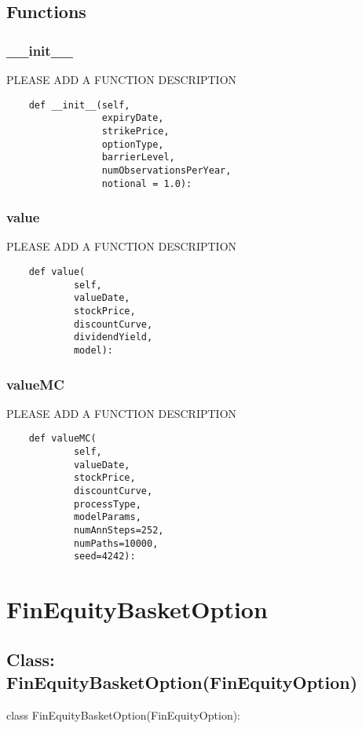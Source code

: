\documentclass[twoside,11pt]{book}
\begin{document}
\subsection*{Functions}

\subsubsection*{{\bf \_\_init\_\_}}
PLEASE ADD A FUNCTION DESCRIPTION

\begin{lstlisting}
    def __init__(self,
                 expiryDate,
                 strikePrice,
                 optionType,
                 barrierLevel,
                 numObservationsPerYear,
                 notional = 1.0):
\end{lstlisting}

\subsubsection*{{\bf value}}
PLEASE ADD A FUNCTION DESCRIPTION

\begin{lstlisting}
    def value(
            self,
            valueDate,
            stockPrice,
            discountCurve,
            dividendYield,
            model):
\end{lstlisting}

\subsubsection*{{\bf valueMC}}
PLEASE ADD A FUNCTION DESCRIPTION

\begin{lstlisting}
    def valueMC(
            self,
            valueDate,
            stockPrice,
            discountCurve,
            processType,
            modelParams,
            numAnnSteps=252,
            numPaths=10000,
            seed=4242):
\end{lstlisting}

\newpage
\section{FinEquityBasketOption}

\subsection*{Class: FinEquityBasketOption(FinEquityOption)}
class FinEquityBasketOption(FinEquityOption): 
\end{document}
